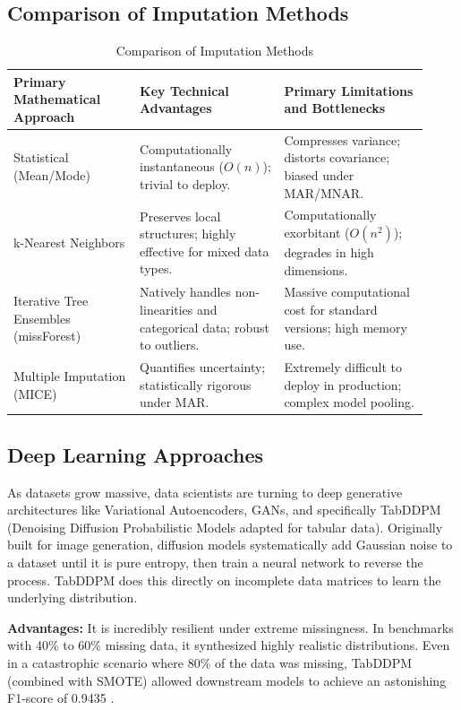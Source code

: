 \documentclass[journal]{IEEEtran}
\begin{document}
\subsection{Comparison of Imputation Methods}

\begin{table}[H]
\renewcommand{\arraystretch}{1.3}
\caption{Comparison of Imputation Methods}
\label{tab:comparison}
\centering
\begin{tabular}{|p{0.28\linewidth}|p{0.32\linewidth}|p{0.32\linewidth}|}
\hline
\textbf{Primary Mathematical Approach} & \textbf{Key Technical Advantages} & \textbf{Primary Limitations and Bottlenecks} \\
\hline
Statistical (Mean/Mode) & Computationally instantaneous ($O(n)$); trivial to deploy. & Compresses variance; distorts covariance; biased under MAR/MNAR. \\
\hline
k-Nearest Neighbors & Preserves local structures; highly effective for mixed data types. & Computationally exorbitant ($O(n^2)$); degrades in high dimensions. \\
\hline
Iterative Tree Ensembles (missForest) & Natively handles non-linearities and categorical data; robust to outliers. & Massive computational cost for standard versions; high memory use. \\
\hline
Multiple Imputation (MICE) & Quantifies uncertainty; statistically rigorous under MAR. & Extremely difficult to deploy in production; complex model pooling. \\
\hline
\end{tabular}
\end{table}

\subsection{Deep Learning Approaches}

\noindent As datasets grow massive, data scientists are turning to deep generative architectures like Variational Autoencoders, GANs, and specifically TabDDPM (Denoising Diffusion Probabilistic Models adapted for tabular data). Originally built for image generation, diffusion models systematically add Gaussian noise to a dataset until it is pure entropy, then train a neural network to reverse the process. TabDDPM does this directly on incomplete data matrices to learn the underlying distribution.

\noindent \textbf{Advantages:} It is incredibly resilient under extreme missingness. In benchmarks with 40\% to 60\% missing data, it synthesized highly realistic distributions. Even in a catastrophic scenario where 80\% of the data was missing, TabDDPM (combined with SMOTE) allowed downstream models to achieve an astonishing F1-score of 0.9435 \cite{choi2025comparison}.
\end{document}
